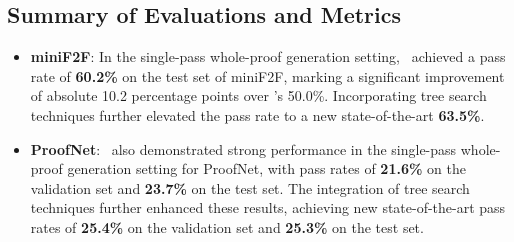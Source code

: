 \subsection{Summary of Evaluations and Metrics}

\begin{itemize}
\item \textbf{miniF2F}: In the single-pass whole-proof generation setting, \thiswork~achieved a pass rate of \textbf{60.2\%} on the test set of miniF2F, marking a significant improvement of absolute 10.2 percentage points over \lastwork's 50.0\%. Incorporating tree search techniques further elevated the pass rate to a new state-of-the-art \textbf{63.5\%}.
\item \textbf{ProofNet}: \thiswork~also demonstrated strong performance in the single-pass whole-proof generation setting for ProofNet, with pass rates of \textbf{21.6\%} on the validation set and \textbf{23.7\%} on the test set. The integration of tree search techniques further enhanced these results, achieving new state-of-the-art pass rates of \textbf{25.4\%} on the validation set and \textbf{25.3\%} on the test set.
\end{itemize}

